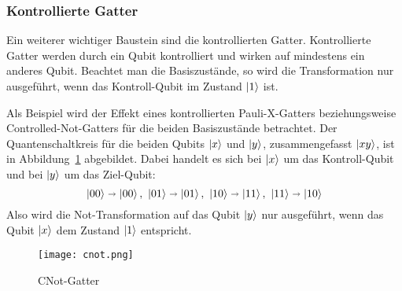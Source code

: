 \subsubsection*{Kontrollierte Gatter}
Ein weiterer wichtiger Baustein sind die kontrollierten Gatter. 
Kontrollierte Gatter werden durch ein Qubit kontrolliert und wirken auf mindestens ein anderes Qubit. 
Beachtet man die Basiszustände, 
so wird die Transformation nur ausgeführt, 
wenn das Kontroll-Qubit im Zustand \(\ket{1}\) ist.

Als Beispiel wird der Effekt eines kontrollierten Pauli-X-Gatters beziehungsweise 
Controlled-Not-Gatters für die beiden Basiszustände betrachtet.
Der Quantenschaltkreis für die beiden Qubits \(\ket{x}\) und \(\ket{y}\), zusammengefasst \(\ket{xy}\), 
ist in Abbildung~\ref{fig:cnot} abgebildet.
Dabei handelt es sich bei \(\ket{x}\) um das Kontroll-Qubit und bei \(\ket{y}\) um das Ziel-Qubit:
\[\ket{00}\shortrightarrow\ket{00},~\ket{01}\shortrightarrow\ket{01},~
\ket{10}\shortrightarrow\ket{11},~\ket{11}\shortrightarrow\ket{10}
  \]
Also wird die Not-Transformation auf das Qubit \(\ket{y}\) nur ausgeführt, 
wenn das Qubit \(\ket{x}\) dem Zustand \(\ket{1}\) entspricht.
\begin{figure}[H]
  \centering
  \texttt{[image: cnot.png]}
  \caption{CNot-Gatter}
  \label{fig:cnot}
\end{figure}

